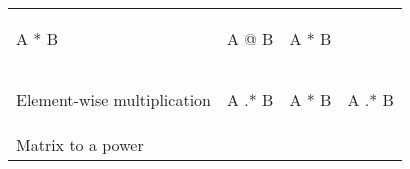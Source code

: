 \documentclass[10pt, landscape]{article}
\newenvironment{Shaded}{}{}
\newcommand{\OperatorTok}[1]{\textcolor[rgb]{0.40,0.40,0.40}{{#1}}}
\newcommand{\NormalTok}[1]{{#1}}
\begin{document}
\begin{multicols*}{2}
\begin{tabular}[ ]{@{}llll@{}}
\begin{minipage}[t]{0.22\columnwidth}
\begin{Shaded}
\begin{Highlighting}[]
\NormalTok{A * B}
\end{Highlighting}
\end{Shaded}
\strut
\end{minipage} & \begin{minipage}[t]{0.23\columnwidth}\raggedright\strut
\begin{Shaded}
\begin{Highlighting}[]
\NormalTok{A @ B}
\end{Highlighting}
\end{Shaded}
\strut
\end{minipage} & \begin{minipage}[t]{0.20\columnwidth}\raggedright\strut
\begin{Shaded}
\begin{Highlighting}[]
\NormalTok{A * B}
\end{Highlighting}
\end{Shaded}
\strut
\end{minipage}\tabularnewline
\begin{minipage}[t]{0.23\columnwidth}\raggedright\strut
Element-wise multiplication\strut
\end{minipage} & \begin{minipage}[t]{0.22\columnwidth}\raggedright\strut
\begin{Shaded}
\begin{Highlighting}[]
\NormalTok{A .* B}
\end{Highlighting}
\end{Shaded}
\strut
\end{minipage} & \begin{minipage}[t]{0.23\columnwidth}\raggedright\strut
\begin{Shaded}
\begin{Highlighting}[]
\NormalTok{A }\OperatorTok{*} \NormalTok{B}
\end{Highlighting}
\end{Shaded}
\strut
\end{minipage} & \begin{minipage}[t]{0.20\columnwidth}\raggedright\strut
\begin{Shaded}
\begin{Highlighting}[]
\NormalTok{A .* B}
\end{Highlighting}
\end{Shaded}
\strut
\end{minipage}\tabularnewline
\begin{minipage}[t]{0.23\columnwidth}\raggedright\strut
Matrix to a power\strut
\end{minipage} & \begin{minipage}[t]{0.22\columnwidth}\raggedright\strut

\end{minipage}
\end{tabular}
\end{multicols*}
\end{document}
